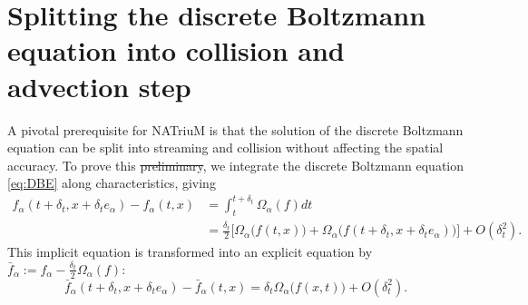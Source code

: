 \documentclass[1p, sort&compress]{elsarticle}
\providecommand{\e}[1]{\ensuremath{\times 10^{#1}}}
\providecommand{\DIFaddtex}[1]{{\protect\color{blue}\uwave{#1}}} %
\providecommand{\DIFdeltex}[1]{{\protect\color{red}\sout{#1}}}                      %
\providecommand{\DIFaddbegin}{} %
\providecommand{\DIFaddend}{} %
\providecommand{\DIFdelbegin}{} %
\providecommand{\DIFdelend}{} %
\providecommand{\DIFadd}[1]{\texorpdfstring{\DIFaddtex{#1}}{#1}} %
\providecommand{\DIFdel}[1]{\texorpdfstring{\DIFdeltex{#1}}{}} %
\newcommand{\DIFscaledelfig}{0.5}
\newlength{\DIFdelgraphicswidth} %
\newlength{\DIFdelgraphicsheight} %
\newcommand{\DIFaddincludegraphics}[2][]{{\color{blue}\fbox{\DIFOincludegraphics[#1]{#2}}}} %
\newcommand{\DIFdelincludegraphics}[2][]{%
\sbox{\DIFdelgraphicsbox}{\DIFOincludegraphics[#1]{#2}}%
\settoboxwidth{\DIFdelgraphicswidth}{\DIFdelgraphicsbox} %
\settoboxtotalheight{\DIFdelgraphicsheight}{\DIFdelgraphicsbox} %
\scalebox{\DIFscaledelfig}{%
\parbox[b]{\DIFdelgraphicswidth}{\usebox{\DIFdelgraphicsbox}\\[-\baselineskip] \rule{\DIFdelgraphicswidth}{0em}}\llap{\resizebox{\DIFdelgraphicswidth}{\DIFdelgraphicsheight}{%
\setlength{\unitlength}{\DIFdelgraphicswidth}%
\begin{picture}(1,1)%
\thicklines\linethickness{2pt} %
{\color[rgb]{1,0,0}\put(0,0){\framebox(1,1){}}}%
{\color[rgb]{1,0,0}\put(0,0){\line( 1,1){1}}}%
{\color[rgb]{1,0,0}\put(0,1){\line(1,-1){1}}}%
\end{picture}%
}\hspace*{3pt}}} %
} %
\DeclareRobustCommand{\DIFaddbegin}{\DIFOaddbegin \let\includegraphics\DIFaddincludegraphics} %
\DeclareRobustCommand{\DIFaddend}{\DIFOaddend \let\includegraphics\DIFOincludegraphics} %
\DeclareRobustCommand{\DIFdelbegin}{\DIFOdelbegin \let\includegraphics\DIFdelincludegraphics} %
\DeclareRobustCommand{\DIFdelend}{\DIFOaddend \let\includegraphics\DIFOincludegraphics} %
\begin{document}


\section{Splitting the discrete Boltzmann equation into collision and advection step}
\label{sec:Appendix}
A pivotal prerequisite for NATriuM is that the solution of the discrete Boltzmann equation can be split into streaming and collision without affecting the spatial accuracy. To prove this \DIFdelbegin \DIFdel{preliminary}\DIFdelend \DIFaddbegin \DIFadd{prerequisite}\DIFaddend , we integrate the discrete Boltzmann equation \eqref{eq:DBE} along characteristics, giving
\begin{align*}
	f_{\alpha} (t+\delta_t, x+\delta_t e_{\alpha}) - f_{\alpha} (t,x)
		&= \int_{t}^{t+\delta_t} \Omega_{\alpha} (f) dt \\
		&= \frac{\delta_t}{2} \big[ \Omega_{\alpha} \big(f(t,x)\big) 
			+ \Omega_{\alpha} \big(f(t+\delta_t, x+\delta_t e_{\alpha}) \big) \big] 
			+ O \left( \delta_{t}^{2} \right).
\end{align*}
This implicit equation is transformed into an explicit equation by
$\bar{f}_{\alpha} := f_{\alpha} - \frac{\delta_t}{2} \Omega_{\alpha}(f):$
\begin{equation}
	\label{eq:transformed}
	\bar{f}_{\alpha} (t+\delta_t, x+\delta_t e_{\alpha}) - \bar{f}_{\alpha} (t,x)
		= \delta_t \Omega_{\alpha} \big( f(x,t) \big) + O \left( \delta_{t}^{2} \right).
\end{equation}
\end{document}
